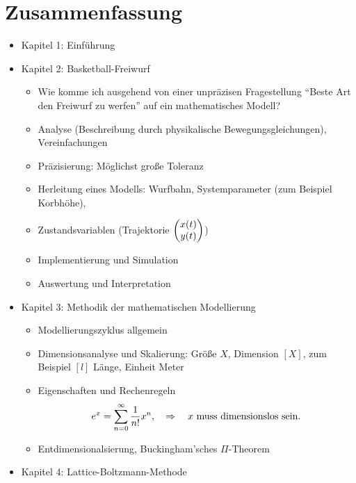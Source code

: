 \documentclass[
 a4paper,
 12pt,
 parskip=half
 ]{scrreprt}
\theoremstyle{plain}
\theoremstyle{definition}
\begin{document}
\chapter*{Zusammenfassung}
\begin{itemize}
\item Kapitel 1: Einführung
\item Kapitel 2: Basketball-Freiwurf
  \begin{itemize}
  \item Wie komme ich ausgehend von einer unpräzisen Fragestellung ``Beste Art den
    Freiwurf zu werfen'' auf ein mathematisches Modell?
  \item   Analyse (Beschreibung durch physikalische Bewegungsgleichungen),
    Vereinfachungen
  \item Präzisierung: Möglichst große Toleranz
  \item Herleitung eines Modells: Wurfbahn, Systemparameter (zum Beispiel
    Korbhöhe), 
  \item Zustandsvariablen (Trajektorie $\begin{pmatrix}x(t) \\ y(t)\end{pmatrix}$)
  \item Implementierung und Simulation
  \item Auswertung und Interpretation
  \end{itemize}
\item Kapitel 3: Methodik der mathematischen Modellierung
  \begin{itemize}
  \item Modellierungszyklus allgemein
  \item Dimensionsanalyse und Skalierung: Größe $X$, Dimension $[X]$, zum
    Beispiel $[l]$ Länge, Einheit Meter
  \item Eigenschaften und Rechenregeln
    \[ e^x = \sum_{n=0}^\infty \frac{1}{n!} x^n, \quad \Rightarrow \quad \text{$x$ muss dimensionslos
        sein.} \]
  \item Entdimensionalsierung, Buckingham'sches $\Pi$-Theorem
  \end{itemize}
\item Kapitel 4: Lattice-Boltzmann-Methode
\end{itemize}
\end{document}
